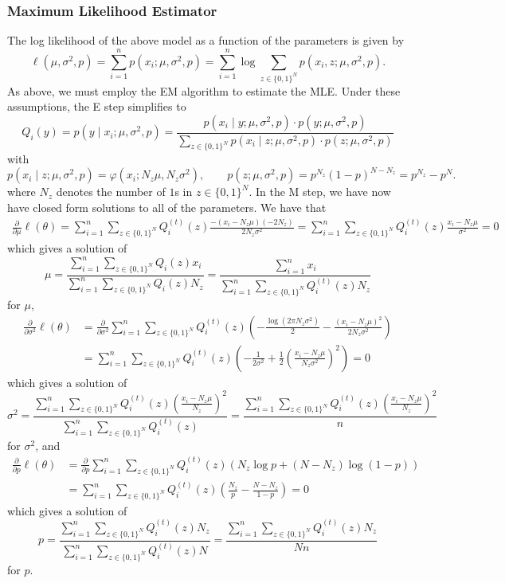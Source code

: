 \documentclass{article}
\begin{document}
\subsubsection{Maximum Likelihood Estimator}
The log likelihood of the above model as a function of the parameters is given by
\[
  \ell(\mu,\sigma^2,p) = \sum_{i=1}^n p(x_i;\mu,\sigma^2,p) = \sum_{i=1}^n \log \sum_{z\in\{0,1\}^N} p(x_i,z;\mu,\sigma^2,p).
\]
As above, we must employ the EM algorithm to estimate the MLE. Under these assumptions, the E step simplifies to
\[
  Q_i(y) = p(y\mid x_i; \mu, \sigma^2, p) = \frac{p(x_i\mid y; \mu,\sigma^2,p)\cdot p(y;\mu,\sigma^2,p)}{\sum_{z\in\{0,1\}^N} p(x_i\mid z;\mu,\sigma^2,p)\cdot p(z;\mu,\sigma^2,p)}
\]
with
\[
  p(x_i\mid z; \mu,\sigma^2,p) = \varphi\left(x_i;N_z\mu, N_z\sigma^2\right),\qquad p(z;\mu,\sigma^2,p) = p^{N_z}(1-p)^{N-N_z} = p^{N_z} - p^N.
\]
where $N_z$ denotes the number of $1$s in $z\in\{0,1\}^N$. In the M step, we have now have closed form solutions to all of the parameters. We have that
\begin{align*}
  \frac{\partial}{\partial\mu}\ell(\theta) = \sum_{i=1}^n\sum_{z\in\{0,1\}^N} Q_i^{(t)}(z)\frac{-(x_i-N_z\mu)(-2N_z)}{2N_z\sigma^2} = \sum_{i=1}^n\sum_{z\in\{0,1\}^N} Q_i^{(t)}(z)\frac{x_i-N_z\mu}{\sigma^2} = 0
\end{align*}
which gives a solution of
\[
  \mu = \frac{\sum_{i=1}^n\sum_{z\in\{0,1\}^N} Q_i(z)x_i}{\sum_{i=1}^n\sum_{z\in\{0,1\}^N} Q_i(z)N_z} = \boxed{\frac{\sum_{i=1}^n x_i}{\sum_{i=1}^n\sum_{z\in\{0,1\}^N} Q_i^{(t)}(z)N_z}}
\]
for $\mu$,
\begin{align*}
  \frac{\partial}{\partial\sigma^2}\ell(\theta) &= \frac{\partial}{\partial\sigma^2}\sum_{i=1}^n\sum_{z\in\{0,1\}^N}Q_i^{(t)}(z)\left(-\frac{\log(2\pi N_z\sigma^2)}2 - \frac{(x_i-N_z\mu)^2}{2N_z\sigma^2}\right) \\
  &= \sum_{i=1}^n\sum_{z\in\{0,1\}^N}Q_i^{(t)}(z)\left(-\frac1{2\sigma^2} + \frac12\left(\frac{x_i-N_z\mu}{N_z\sigma^2}\right)^2\right) = 0
\end{align*}
which gives a solution of
\[
  \sigma^2 = \frac{\sum_{i=1}^n\sum_{z\in\{0,1\}^N} Q_i^{(t)}(z)\left(\frac{x_i-N_z\mu}{N_z}\right)^2}{\sum_{i=1}^n\sum_{z\in\{0,1\}^N} Q_i^{(t)}(z)} = \boxed{\frac{\sum_{i=1}^n\sum_{z\in\{0,1\}^N} Q_i^{(t)}(z)\left(\frac{x_i-N_z\mu}{N_z}\right)^2}n}
\]
for $\sigma^2$, and
\begin{align*}
  \frac{\partial}{\partial p}\ell(\theta) &= \frac{\partial}{\partial p}\sum_{i=1}^n\sum_{z\in\{0,1\}^N}Q_i^{(t)}(z)\left(N_z\log p + (N-N_z)\log (1-p)\right) \\
  &= \sum_{i=1}^n\sum_{z\in\{0,1\}^N}Q_i^{(t)}(z)\left(\frac{N_z}p - \frac{N-N_z}{1-p}\right) = 0
\end{align*}
which gives a solution of
\[
  p = \frac{\sum_{i=1}^n\sum_{z\in\{0,1\}^N} Q_i^{(t)}(z) N_z}{\sum_{i=1}^n\sum_{z\in\{0,1\}^N} Q_i^{(t)}(z)N} = \boxed{\frac{\sum_{i=1}^n\sum_{z\in\{0,1\}^N} Q_i^{(t)}(z) N_z}{Nn}}
\]
for $p$.
\end{document}
